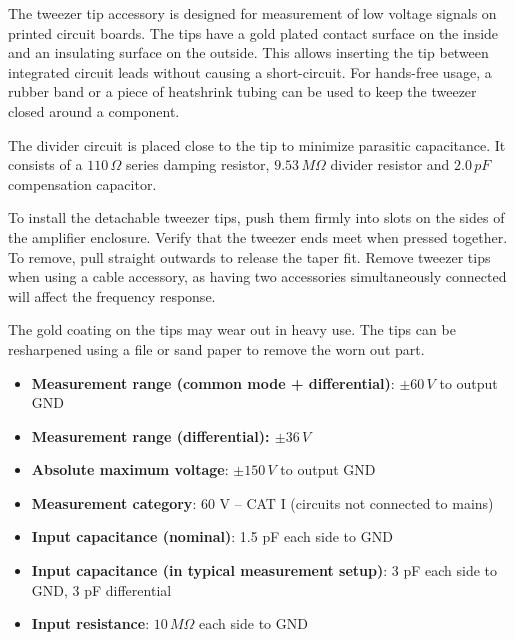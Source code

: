 \documentclass[10pt]{manual}
\begin{document}
The tweezer tip accessory is designed for measurement of low voltage signals on printed circuit boards.
The tips have a gold plated contact surface on the inside and an insulating surface on the outside.
This allows inserting the tip between integrated circuit leads without causing a short-circuit.
For hands-free usage, a rubber band or a piece of heatshrink tubing can be used to keep the tweezer closed around a component.

The divider circuit is placed close to the tip to minimize parasitic capacitance.
It consists of a $110\,\Omega$ series damping resistor, $9.53\,M\Omega$ divider resistor and $2.0\,pF$ compensation capacitor.

To install the detachable tweezer tips, push them firmly into slots on the sides of the amplifier enclosure.
Verify that the tweezer ends meet when pressed together.
To remove, pull straight outwards to release the taper fit.
Remove tweezer tips when using a cable accessory, as having two accessories simultaneously connected will affect the frequency response.

The gold coating on the tips may wear out in heavy use.
The tips can be resharpened using a file or sand paper to remove the worn out part.

\begin{itemize}
\item \textbf{Measurement range (common mode + differential)}: $\pm60\,V$ to output GND
\item \textbf{Measurement range (differential): $\pm36\,V$}
\item \textbf{Absolute maximum voltage}: $\pm150\,V$ to output GND
\item \textbf{Measurement category}: 60 V -- CAT I (circuits not connected to mains)
\item \textbf{Input capacitance (nominal)}: 1.5 pF each side to GND
\item \textbf{Input capacitance (in typical measurement setup)}: 3 pF each side to GND, 3 pF differential
\item \textbf{Input resistance}: $10\,M\Omega$ each side to GND
\end{itemize}
\end{document}

